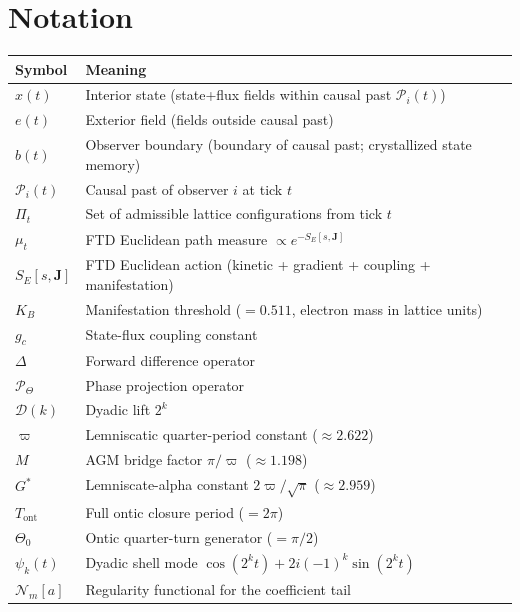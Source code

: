 \documentclass[11pt]{article}
\theoremstyle{tight}
\theoremstyle{plainroman}
\newcommand{\Tont}{T_{\mathrm{ont}}}
\newcommand{\Thetaont}{\Theta_{0}}
\newcommand{\Nreg}{\mathcal{N}}
\newcommand{\causal}{\mathcal{P}}
\begin{document}
\appendix
\section{Notation}
\begin{center}
\renewcommand{\arraystretch}{1.2}
\begin{tabular}{>{\raggedright\arraybackslash}p{} >{\raggedright\arraybackslash}p{}}
\toprule
Symbol & Meaning \\
\midrule
$x(t)$ & Interior state (state+flux fields within causal past $\causal_i(t)$) \\
$e(t)$ & Exterior field (fields outside causal past) \\
$b(t)$ & Observer boundary (boundary of causal past; crystallized state memory) \\
$\causal_i(t)$ & Causal past of observer $i$ at tick $t$ \\
$\Pi_t$ & Set of admissible lattice configurations from tick $t$ \\
$\mu_t$ & FTD Euclidean path measure $\propto e^{-S_E[s,\mathbf J]}$ \\
$S_E[s,\mathbf J]$ & FTD Euclidean action (kinetic + gradient + coupling + manifestation) \\
$K_B$ & Manifestation threshold ($=0.511$, electron mass in lattice units) \\
$g_c$ & State-flux coupling constant \\
$\Delta$ & Forward difference operator \\
$\mathcal P_{\Theta}$ & Phase projection operator \\
$\mathcal D(k)$ & Dyadic lift $2^k$ \\
$\varpi$ & Lemniscatic quarter-period constant ($\approx 2.622$) \\
$M$ & AGM bridge factor $\pi/\varpi$ ($\approx 1.198$) \\
$G^*$ & Lemniscate-alpha constant $2\varpi/\sqrt{\pi}$ ($\approx 2.959$) \\
$\Tont$ & Full ontic closure period ($=2\pi$) \\
$\Thetaont$ & Ontic quarter-turn generator ($=\pi/2$) \\
$\psi_k(t)$ & Dyadic shell mode $\cos(2^k t)+2i(-1)^k\sin(2^k t)$ \\
$\Nreg_m[a]$ & Regularity functional for the coefficient tail \\
\bottomrule
\end{tabular}
\end{center}
\end{document}
